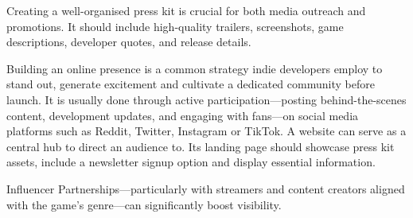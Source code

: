 Creating a well-organised press kit is crucial for both media outreach and promotions. It should include high-quality trailers, screenshots, game descriptions, developer quotes, and release details.
\cite{impress_press-kit}

Building an online presence is a common strategy indie developers employ to stand out, generate excitement and cultivate a dedicated community before launch. It is usually done through active participation---posting behind-the-scenes content, development updates, and engaging with fans---on social media platforms such as Reddit, Twitter, Instagram or TikTok. A website can serve as a central hub to direct an audience to. Its landing page should showcase press kit assets, include a newsletter signup option and display essential information.
\cite{venkatesh_successful-release}

Influencer Partnerships---particularly with streamers and content creators aligned with the game’s genre---can significantly boost visibility.
\cite{developer_introduction-to-marketing}

